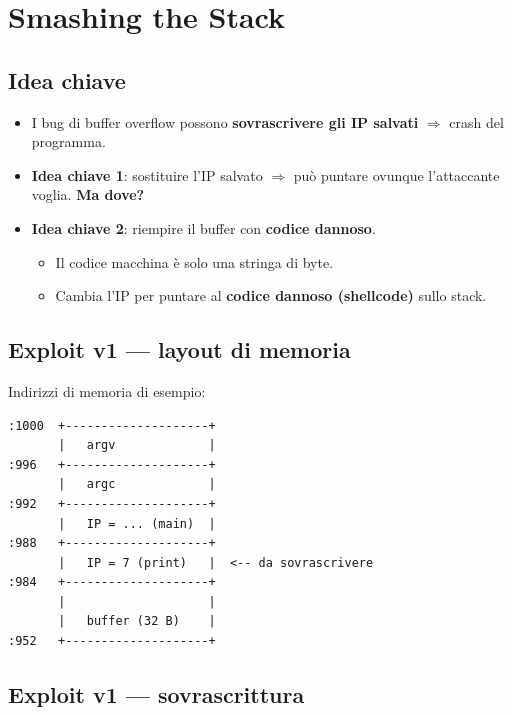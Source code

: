 
\section{Smashing the Stack}

\subsection{Idea chiave}

\begin{itemize}
  \item I bug di buffer overflow possono \textbf{sovrascrivere gli IP salvati} $\Rightarrow$ crash del programma.
  \item \textbf{Idea chiave 1}: sostituire l'IP salvato $\Rightarrow$ pu\`o puntare ovunque l'attaccante voglia. \textbf{Ma dove?}
  \item \textbf{Idea chiave 2}: riempire il buffer con \textbf{codice dannoso}.
    \begin{itemize}
      \item Il codice macchina \`e solo una stringa di byte.
      \item Cambia l'IP per puntare al \textbf{codice dannoso (shellcode)} sullo stack.
    \end{itemize}
\end{itemize}

\subsection{Exploit v1 --- layout di memoria}

Indirizzi di memoria di esempio:
\begin{verbatim}
:1000  +--------------------+
       |   argv             |
:996   +--------------------+
       |   argc             |
:992   +--------------------+
       |   IP = ... (main)  |
:988   +--------------------+
       |   IP = 7 (print)   |  <-- da sovrascrivere
:984   +--------------------+
       |                    |
       |   buffer (32 B)    |
:952   +--------------------+
\end{verbatim}

\subsection{Exploit v1 --- sovrascrittura}

